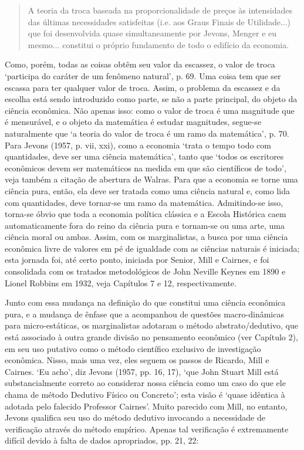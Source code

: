 \documentclass[12pt]{article}
\begin{document}
\begin{quote}
A teoria da troca baseada na proporcionalidade de preços às intensidades das últimas necessidades satisfeitas (i.e. aos Graus Finais de Utilidade...) que foi desenvolvida quase simultaneamente por Jevons, Menger e eu mesmo... constitui o próprio fundamento de todo o edifício da economia.
\end{quote}

Como, porém, todas as coisas obtêm seu valor da escassez, o valor de troca ‘participa do caráter de um fenômeno natural’, p. 69. Uma coisa tem que ser escassa para ter qualquer valor de troca. Assim, o problema da escassez e da escolha está sendo introduzido como parte, se não a parte principal, do objeto da ciência econômica. Não apenas isso: como o valor de troca é uma magnitude que é mensurável, e o objeto da matemática é estudar magnitudes, segue-se naturalmente que ‘a teoria do valor de troca é um ramo da matemática’, p. 70. Para Jevons (1957, p. vii, xxi), como a economia ‘trata o tempo todo com quantidades, deve ser uma ciência matemática’, tanto que ‘todos os escritores econômicos devem ser matemáticos na medida em que são científicos de todo’, veja também a citação de abertura de Walras. Para que a economia se torne uma ciência pura, então, ela deve ser tratada como uma ciência natural e, como lida com quantidades, deve tornar-se um ramo da matemática. Admitindo-se isso, torna-se óbvio que toda a economia política clássica e a Escola Histórica caem automaticamente fora do reino da ciência pura e tornam-se ou uma arte, uma ciência moral ou ambas. Assim, com os marginalistas, a busca por uma ciência econômica livre de valores em pé de igualdade com as ciências naturais é iniciada; esta jornada foi, até certo ponto, iniciada por Senior, Mill e Cairnes, e foi consolidada com os tratados metodológicos de John Neville Keynes em 1890 e Lionel Robbins em 1932, veja Capítulos 7 e 12, respectivamente.

Junto com essa mudança na definição do que constitui uma ciência econômica pura, e a mudança de ênfase que a acompanhou de questões macro-dinâmicas para micro-estáticas, os marginalistas adotaram o método abstrato/dedutivo, que está associado à outra grande divisão no pensamento econômico (ver Capítulo 2), em seu uso putativo como o método científico exclusivo de investigação econômica. Nisso, mais uma vez, eles seguem os passos de Ricardo, Mill e Cairnes. ‘Eu acho’, diz Jevons (1957, pp. 16, 17), ‘que John Stuart Mill está substancialmente correto ao considerar nossa ciência como um caso do que ele chama de método Dedutivo Físico ou Concreto’; esta visão é ‘quase idêntica à adotada pelo falecido Professor Cairnes’. Muito parecido com Mill, no entanto, Jevons qualifica seu uso do método dedutivo invocando a necessidade de verificação através do método empírico. Apenas tal verificação é extremamente difícil devido à falta de dados apropriados, pp. 21, 22:
\end{document}
